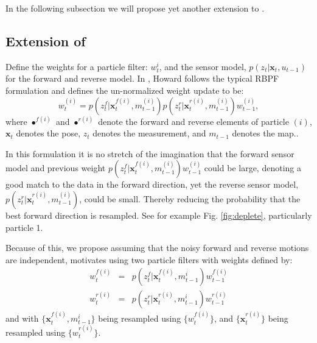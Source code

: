 In the following subsection we will propose yet another extension to \cite{howard2006multi}.

\subsection{Extension of \cite{howard2006multi}}
\label{SS:Back:Contributions}


Define the weights for a particle filter: $w_t^i$, and the sensor model, $p(z_t|\textbf{x}_t,u_{t-1})$ for the forward and reverse model.  In \cite{howard2006multi}, Howard follows the typical RBPF formulation and defines the un-normalized weight update to be:
\begin{equation}
w^{(i)}_t=p(z_{t}^{f}|\textbf{x}_{t}^{f(i)},m_{t-1}^{(i)}) p(z_{t}^r|\textbf{x}_{t}^{r(i)},m_{t-1}^{(i)}) w^{(i)}_{t-1},
\label{eq:combinedweight}
\end{equation}
where $\bullet^{f(i)}$ and $\bullet^{r(i)}$ denote the forward and reverse elements of particle $(i)$, $\textbf{x}_{t}$ denotes the pose, $z_{t}$ denotes the measurement, and $m_{t-1}$ denotes the map..

In this formulation it is no stretch of the imagination that the forward sensor model and previous weight $p(z_{t}^{f}|\textbf{x}_{t}^{f(i)},m_{t-1}^{(i)}) w^{(i)}_{t-1}$ could be large, denoting a good match to the data in the forward direction, yet the reverse sensor model, $p(z_{t}^{r}|\textbf{x}_{t}^{r(i)},m_{t-1}^{(i)})$, could be small.  Thereby reducing the probability that the best forward direction is resampled.  See for example Fig. \ref{fig:deplete}, particularly particle 1.


Because of this, we propose assuming that the noisy forward and reverse motions are independent, motivates using two particle filters with weights defined by:
\begin{eqnarray}
w^{f(i)}_{t}&=&p(z_{t}^f|\textbf{x}_{t}^{f(i)},m_{t-1}^i)  w^{f(i)}_{t-1}\\
w^{r(i)}_{t}&=&p(z_{t}^r|\textbf{x}_{t}^{r(i)},m_{t-1}^i)  w^{r(i)}_{t-1}
\end{eqnarray}
and with $\{\textbf{x}_{t}^{f(i)},m_{t-1}^i\}$ being resampled using $\{w^{f(i)}_{t}\}$, and $\{\textbf{x}_{t}^{r(i)}\}$ being resampled using $\{w^{r(i)}_{t}\}$.  


